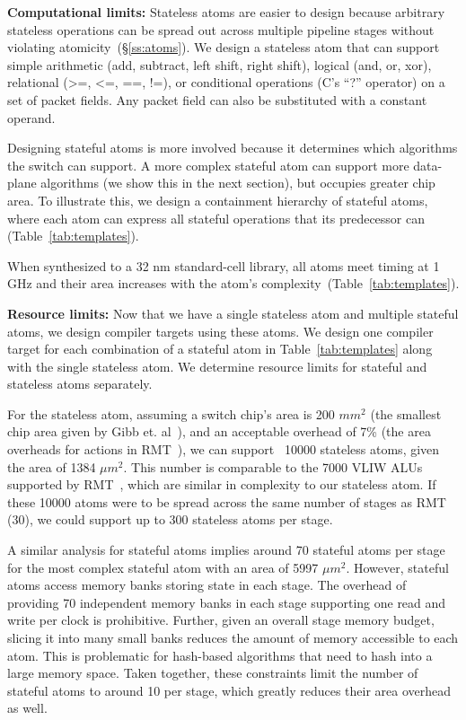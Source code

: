 \textbf{Computational limits:}
Stateless atoms are easier to design because arbitrary stateless operations can
be spread out across multiple pipeline stages without violating
atomicity~(\S\ref{ss:atoms}). We design a stateless atom that can support
simple arithmetic (add, subtract, left shift, right shift), logical (and, or,
xor), relational (>=, <=, ==, !=), or conditional operations (C's ``?''
operator) on a set of packet fields. Any packet field can also be substituted
with a constant operand.

Designing stateful atoms is more involved because it determines which
algorithms the switch can support. A more complex stateful atom can support
more data-plane algorithms (we show this in the next section), but occupies
greater chip area. To illustrate this, we design a containment hierarchy of
stateful atoms, where each atom can express all stateful operations that its
predecessor can (Table~\ref{tab:templates}).

When synthesized to a 32 nm standard-cell library, all atoms meet timing at 1
GHz and their area increases with the atom's
complexity~(Table~\ref{tab:templates}).

\textbf{Resource limits:}
Now that we have a single stateless atom and multiple stateful atoms, we design
compiler targets using these atoms.  We design one compiler target for each
combination of a stateful atom in Table~\ref{tab:templates} along with the
single stateless atom. We determine resource limits for stateful and stateless
atoms separately.

For the stateless atom, assuming a switch chip's area is 200 $mm^2$ (the
smallest chip area given by Gibb et. al~\cite{gibb_parsing}), and an acceptable
overhead of 7\% (the area overheads for actions in RMT~\cite{rmt}), we can
support ~10000 stateless atoms, given the area of 1384 $\mu m^2$.  This number
is comparable to the 7000 VLIW ALUs supported by RMT~\cite{rmt}, which are
similar in complexity to our stateless atom. If these 10000 atoms were to be
spread across the same number of stages as RMT (30), we could support up to 300
stateless atoms per stage.

A similar analysis for stateful atoms implies around 70 stateful atoms per
stage for the most complex stateful atom with an area of 5997 $\mu m^2$.
However, stateful atoms access memory banks storing state in each stage. The
overhead of providing 70 independent memory banks in each stage supporting one
read and write per clock is prohibitive. Further, given an
overall stage memory budget, slicing it into many small banks reduces the
amount of memory accessible to each atom. This is problematic for hash-based
algorithms that need to hash into a large memory space. Taken together, these
constraints limit the number of stateful atoms to around 10 per stage, which
greatly reduces their area overhead as well.

